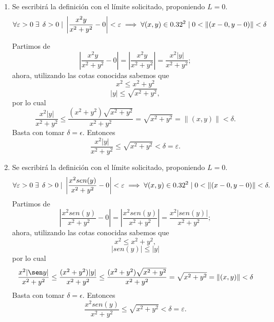 \begin{enumerate}
  \item
Se escribir\'a la definici\'on con el límite solicitado, proponiendo $L=0$.
\[
\forall \varepsilon > 0 \; \exists\: \:\delta > 0 \;|\; \left| \frac{x^2y}{x^2+y^2} - 0\right| < \varepsilon  \implies \forall (x,y) \in 0.32^2 \;|\; 0 < \|(x-0,y-0)\| < \delta
\]

Partimos de
\[
\left| \frac{x^2y}{x^2+y^2} - 0\right|=\left| \frac{x^2y}{x^2+y^2}\right|= \frac{x^2|y|}{x^2+y^2};
\]
ahora, utilizando las cotas conocidas sabemos que
\[
x^2\leq x^2+y^2 
\]
\[
|y|\leq \sqrt{x^2+y^2} ,
\]
por lo cual
\[
\frac{x^2|y|}{x^2+y^2}\leq\frac{(x^2+y^2)\sqrt{x^2+y^2} }{x^2+y^2}=\sqrt{x^2+y^2}=\|(x,y)\|<\delta.
\]
Basta con tomar $\delta=\epsilon$. Entonces
\[
\frac{x^2|y|}{x^2+y^2}\leq\sqrt{x^2+y^2}<\delta=\varepsilon.
\]
\item 
Se escribir\'a la definici\'on con el límite solicitado, proponiendo $L=0$.
\[
\forall \varepsilon > 0 \;\exists\: \:\delta > 0 \;|\; \left| \frac{x^2sen(y)}{x^2+y^2} - 0\right| < \varepsilon \implies \forall (x,y) \in 0.32^2 \;|\; 0 < \|(x-0,y-0)\| < \delta.
\]
Partimos de
\[
| \frac{x^2sen(y)}{x^2+y^2} - 0|=| \frac{x^2sen(y)}{x^2+y^2}|= \frac{x^2|sen(y)|}{x^2+y^2};
\]
ahora, utilizando las cotas conocidas sabemos que
\[
x^2\leq x^2+y^2, 
\]
\[
|sen(y)|\leq |y|
\]
por lo cual
\[
\frac{x^2|\sen y|}{x^2+y^2}\leq\frac{(x^2+y^2)|y| }{x^2+y^2}\leq\frac{(x^2+y^2)\sqrt{x^2+y^2} }{x^2+y^2}=\sqrt{x^2+y^2}=\|(x,y)\|<\delta
\]
Basta con tomar $\delta=\epsilon$. Entonces
\[
\frac{x^2sen (y)}{x^2+y^2}\leq\sqrt{x^2+y^2}<\delta=\varepsilon.
\]
\end{enumerate}

